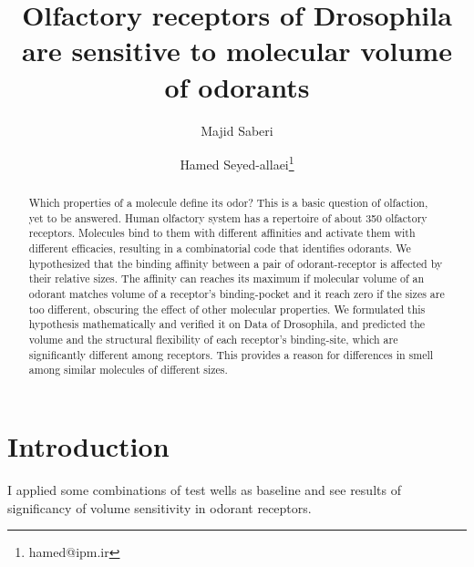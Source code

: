 \documentclass[11pt]{paper} %
\title{Olfactory receptors of Drosophila are sensitive to molecular volume of odorants}
\author{Majid Saberi \and Hamed Seyed-allaei\thanks{hamed@ipm.ir}}
\begin{document}

\maketitle

\begin{abstract} 
Which properties of a molecule define its odor? This is a basic question of olfaction, 
yet to be answered. Human olfactory system has a repertoire of about 350 olfactory receptors. 
Molecules bind to them with different affinities and activate them with different efficacies, 
resulting in a combinatorial code that identifies odorants. 
We hypothesized that the binding affinity between a pair of odorant-receptor is affected by their relative sizes. 
The affinity can reaches its maximum if molecular volume of an odorant matches volume of a receptor's binding-pocket 
and it reach zero if the sizes are too different, 
obscuring the effect of other molecular properties. 
We formulated this hypothesis mathematically and verified it on Data of Drosophila, 
and predicted the volume and the structural flexibility of each receptor's binding-site, 
which are significantly different among receptors. 
This provides a reason for differences in smell among similar molecules of different sizes. 
\end{abstract}




\section*{Introduction}

I applied some combinations of test wells as baseline and see results of significancy of volume sensitivity in odorant receptors.
  
\end{document}
